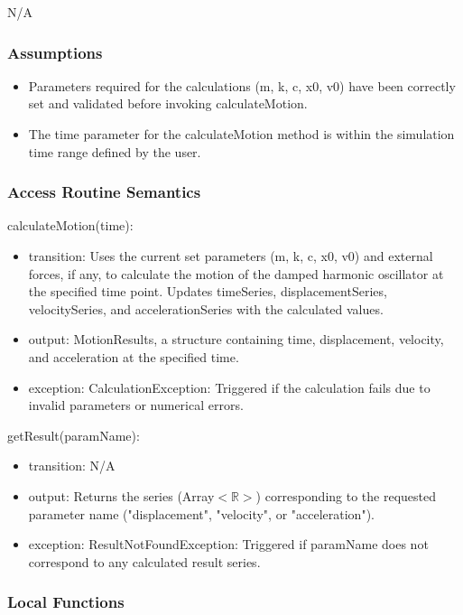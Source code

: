 \documentclass[12pt, titlepage]{article}
\begin{document}
N/A

\subsubsection{Assumptions}

\begin{itemize}
  \item Parameters required for the calculations (m, k, c, x0, v0) have been correctly set and validated before invoking calculateMotion.
  \item The time parameter for the calculateMotion method is within the simulation time range defined by the user.
\end{itemize}

\subsubsection{Access Routine Semantics}

\noindent calculateMotion(time):
\begin{itemize}
\item transition: Uses the current set parameters (m, k, c, x0, v0) and external forces, if any, to calculate the motion of the damped harmonic oscillator at the specified time point. Updates timeSeries, displacementSeries, velocitySeries, and accelerationSeries with the calculated values.
\item output: MotionResults, a structure containing time, displacement, velocity, and acceleration at the specified time.
\item exception: CalculationException: Triggered if the calculation fails due to invalid parameters or numerical errors.
\end{itemize}

\noindent getResult(paramName):
\begin{itemize}
\item transition: N/A
\item output: Returns the series (Array$<\mathbb{R}>$) corresponding to the requested parameter name ("displacement", "velocity", or "acceleration").
\item exception: ResultNotFoundException: Triggered if paramName does not correspond to any calculated result series.
\end{itemize}

\subsubsection{Local Functions}
\end{document}
